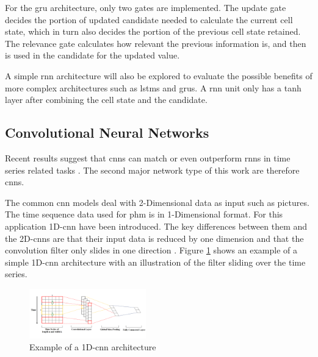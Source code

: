 \documentclass[conference]{IEEEtran}
\begin{document}
For the \gls{gru} architecture, only two gates are implemented. The update gate decides the portion of updated candidate needed to calculate the current cell state, which in turn also decides the portion of the previous cell state retained. The relevance gate calculates how relevant the previous information is, and then is used in the candidate for the updated value.

A simple \gls{rnn} architecture will also be explored to evaluate the possible benefits of more complex architectures such as \glspl{lstm} and \glspl{gru}. A \gls{rnn} unit only has a tanh layer after combining the cell state and the candidate.

\subsection{Convolutional Neural Networks}
\label{sec:convolutional_neural_networks}

Recent results suggest that \glspl{cnn} can match or even outperform \glspl{rnn} in time series related tasks \cite{Bai2018}. The second major network type of this work are therefore \glspl{cnn}.

The common \gls{cnn} models deal with 2-Dimensional data as input such as pictures. The time sequence data used for \gls{phm} is in 1-Dimensional format. For this application 1D-\gls{cnn} have been introduced. The key differences between them and the 2D-\glspl{cnn} are that their input data is reduced by one dimension and that the convolution filter only slides in one direction \cite{Akrim2021}. Figure \ref{fig:1D_cnn_architecture} shows an example of a simple 1D-\gls{cnn} architecture with an illustration of the filter sliding over the time series. 

\begin{figure}[htp]
	\centering
	\includegraphics[width=0.45\textwidth]{1D_CNN_Architecture.png}
	\caption{Example of a 1D-\gls{cnn} architecture \cite{Sayyad}}
	\label{fig:1D_cnn_architecture}
\end{figure}
\end{document}
